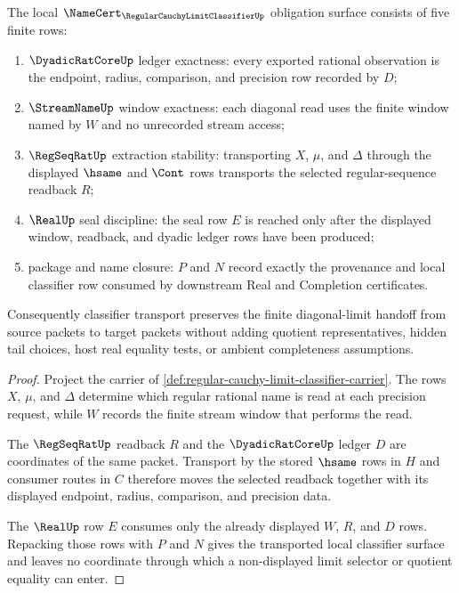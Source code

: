 \begin{theorem}
\label{thm:regular-cauchy-limit-classifier-stability}
The local $\NameCert_{\RegularCauchyLimitClassifierUp}$ obligation surface consists of five finite rows:
\begin{enumerate}
\item $\DyadicRatCoreUp$ ledger exactness: every exported rational observation is the endpoint, radius, comparison, and precision row recorded by $D$;
\item $\StreamNameUp$ window exactness: each diagonal read uses the finite window named by $W$ and no unrecorded stream access;
\item $\RegSeqRatUp$ extraction stability: transporting $X$, $\mu$, and $\Delta$ through the displayed $\hsame$ and $\Cont$ rows transports the selected regular-sequence readback $R$;
\item $\RealUp$ seal discipline: the seal row $E$ is reached only after the displayed window, readback, and dyadic ledger rows have been produced;
\item package and name closure: $P$ and $N$ record exactly the provenance and local classifier row consumed by downstream Real and Completion certificates.
\end{enumerate}
Consequently classifier transport preserves the finite diagonal-limit handoff from source packets to target packets without adding quotient representatives, hidden tail choices, host real equality tests, or ambient completeness assumptions.
\end{theorem}
\begin{proof}
Project the carrier of \autoref{def:regular-cauchy-limit-classifier-carrier}. The rows $X$, $\mu$, and $\Delta$ determine which regular rational name is read at each precision request, while $W$ records the finite stream window that performs the read.

The $\RegSeqRatUp$ readback $R$ and the $\DyadicRatCoreUp$ ledger $D$ are coordinates of the same packet. Transport by the stored $\hsame$ rows in $H$ and consumer routes in $C$ therefore moves the selected readback together with its displayed endpoint, radius, comparison, and precision data.

The $\RealUp$ row $E$ consumes only the already displayed $W$, $R$, and $D$ rows. Repacking those rows with $P$ and $N$ gives the transported local classifier surface and leaves no coordinate through which a non-displayed limit selector or quotient equality can enter.
\end{proof}

